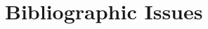\documentclass[a4paper,11pt,oneside]{memoir}
\begin{document}


\chapter{Bibliographic Issues}
\label{ch:bibliographic}




\appendix



\end{document}
